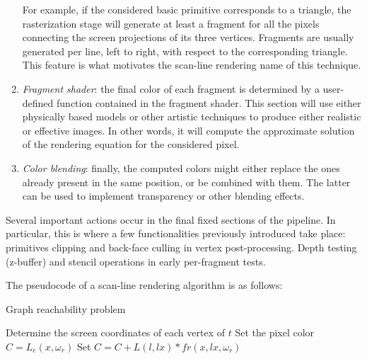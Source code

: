 \begin{enumerate}
        For example, if the considered basic primitive corresponds to a triangle, the rasterization stage will generate at least a fragment for all the pixels connecting the screen projections of its three vertices. 
        Fragments are usually generated per line, left to right, with respect to the corresponding triangle. 
        This feature is what motivates the scan-line rendering name of this technique.
    \item \textit{Fragment shader}: the final color of each fragment is determined by a user-defined function contained in the fragment shader. 
        This section will use either physically based models or other artistic techniques to produce either realistic or effective images. 
        In other words, it will compute the approximate solution of the rendering equation for the considered pixel.
    \item \textit{Color blending}: finally, the computed colors might either replace the ones already present in the same position, or be combined with them. 
        The latter can be used to implement transparency or other blending effects.
\end{enumerate}

Several important actions occur in the final fixed sections of the pipeline. 
In particular, this is where a few functionalities previously introduced take place: primitives clipping and back-face culling in vertex post-processing. 
Depth testing (z-buffer) and stencil operations in early per-fragment tests.

The pseudocode of a scan-line rendering algorithm is as follows:
\begin{algorithm}[H]
    \caption{Graph reachability problem}
        \begin{algorithmic}[1]
                \State{} Determine the screen coordinates of each vertex of $t$
                            \State{} Set the pixel color $C=L_e(x,\omega_r)$
                                \State{} Set $C = C + L(l,lx) * fr(x,lx, \omega_r)$
                            \EndFor{}
                        \EndIf{}
                    \EndFor{}
                \EndFor{}
            \EndFor{}
        \end{algorithmic}
\end{algorithm}

